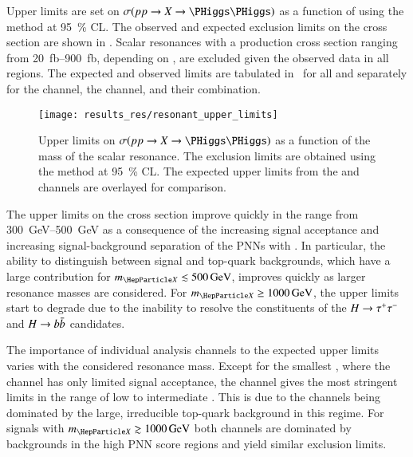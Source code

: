 Upper limits are set on $\sigma(pp \to X \to \HH)$ as a function of \mX using
the \CLs method at \SI{95}{\percent} CL. The observed and expected exclusion
limits on the cross section are shown in . Scalar
resonances with a production cross section ranging from
\SIrange{20}{900}{\femto\barn}, depending on \mX, are excluded given the
observed data in all regions. The expected and observed limits are tabulated
in~ for all \mX and separately for the \hadhad channel,
the \lephad channel, and their combination.

\begin{figure}[htbp]
  \centering

  \texttt{[image: results\_res/resonant\_upper\_limits]}

  \caption[Upper limits on $\sigma(pp \to X \to \HH)$ as a function of the mass
  of the scalar resonance.]{Upper limits on $\sigma(pp \to X \to \HH)$ as a
    function of the mass of the scalar resonance. The exclusion limits are
    obtained using the \CLs method at \SI{95}{\percent} CL. The expected upper
    limits from the \hadhad and \lephad channels are overlayed for comparison.}%
  \label{fig:res_upper_limits}
\end{figure}

The upper limits on the cross section improve quickly in the \mX range from
\SIrange{300}{500}{\GeV} as a consequence of the increasing signal acceptance
and increasing signal-background separation of the PNNs with \mX. In particular,
the ability to distinguish between signal and top-quark backgrounds, which have
a large contribution for $\mX \lesssim \SI{500}{\GeV}$, improves quickly as
larger resonance masses are considered. For $\mX \geq \SI{1000}{\GeV}$, the
upper limits start to degrade due to the inability to resolve the constituents
of the $H \to \tau^{+} \tau^{-}$ and $H \to b\bar{b}$ candidates.



The importance of individual analysis channels to the expected upper limits
varies with the considered resonance mass. Except for the smallest \mX, where
the \hadhad channel has only limited signal acceptance, the \hadhad channel
gives the most stringent limits in the range of low to intermediate \mX. This is
due to the \lephad channels being dominated by the large, irreducible top-quark
background in this regime. For signals with $\mX \gtrsim \SI{1000}{\GeV}$ both
channels are dominated by \Zjets backgrounds in the high PNN score regions and
yield similar exclusion limits.


